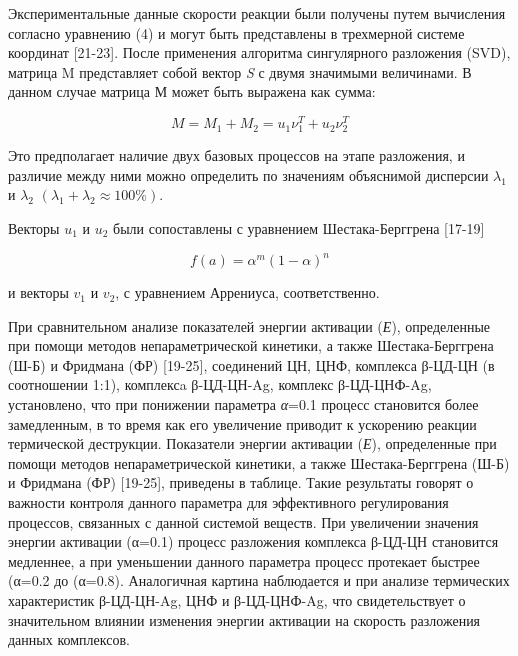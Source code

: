 \begin{multicols}{2}
Экспериментальные данные скорости реакции были получены путем вычисления
согласно уравнению (4) и могут быть представлены в трехмерной системе
координат {[}21-23{]}. После применения алгоритма сингулярного
разложения (SVD), матрица M представляет собой вектор \emph{S} с двумя
значимыми величинами. В данном случае матрица М может быть выражена как
сумма:

\begin{equation}
M = M_{1} + M_{2} = u_{1}\nu_{1}^{T} + u_{2}\nu_{2}^{T}
\end{equation}

Это предполагает наличие двух базовых процессов на этапе разложения, и
различие между ними можно определить по значениям объяснимой дисперсии
$\lambda_1$ и $\lambda_2$ $(\lambda_{1} + \lambda_{2} \approx 100\%)$.

Векторы $u_1$ и $u_2$ были сопоставлены с уравнением Шестака-Берггрена
{[}17-19{]}

\begin{equation}
f(a) = \alpha^{m} (1 - \alpha)^{n}
\end{equation}

и векторы $v_1$ и $v_2$, с уравнением Аррениуса, соответственно.

При сравнительном анализе показателей энергии активации (\emph{Е}),
определенные при помощи методов непараметрической кинетики, а также
Шестака-Берггрена (Ш-Б) и Фридмана (ФР) {[}19-25{]}, соединений ЦН, ЦНФ,
комплекса β-ЦД-ЦН (в соотношении 1:1), комплексa β-ЦД-ЦН-Ag, комплекс
β-ЦД-ЦНФ-Ag, установлено, что при понижении параметра \emph{α}=0.1
процесс становится более замедленным, в то время как его увеличение
приводит к ускорению реакции термической деструкции. Показатели энергии
активации (\emph{Е}), определенные при помощи методов непараметрической
кинетики, а также Шестака-Берггрена (Ш-Б) и Фридмана (ФР) {[}19-25{]},
приведены в таблице. Такие результаты говорят о важности контроля
данного параметра для эффективного регулирования процессов, связанных с
данной системой веществ. При увеличении значения энергии активации
(α=0.1) процесс разложения комплекса β-ЦД-ЦН становится медленнее, а при
уменьшении данного параметра процесс протекает быстрее (α=0.2 до
(α=0.8). Аналогичная картина наблюдается и при анализе термических
характеристик β-ЦД-ЦН-Ag, ЦНФ и β-ЦД-ЦНФ-Ag, что свидетельствует о
значительном влиянии изменения энергии активации на скорость разложения
данных комплексов.
\end{multicols}

